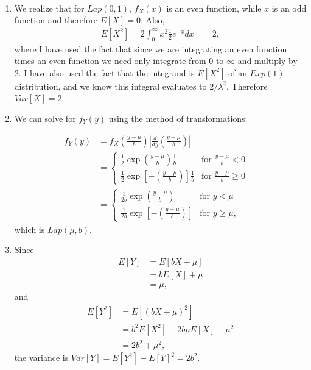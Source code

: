 \begin{problem}{17} $ $

\begin{enumerate}
\item
We realize that for $Lap(0, 1)$, $f_X(x)$ is an even function, while $x$ is an odd function and therefore $E[X]=0$.  Also, 
\begin{align*}
E[X^2] = 2\int_0^{\infty}x^2\frac{1}{2}e^{-x}dx
&=2,
\end{align*}
where I have used the fact that since we are integrating an even function times an even function we need only integrate from $0$ to $\infty$ and multiply by 2.  I have also used the fact that the integrand is $E[X^2]$ of an $Exp(1)$ distribution, and we know this integral evaluates to $2/\lambda^2$.  Therefore $Var[X] = 2$.

\item We can solve for $f_Y(y)$ using the method of transformations:

\begin{align*}  
  f_Y(y) &= f_X\left(\frac{y-\mu}{b} \right)\left | \frac{d}{dy}\left(\frac{y-\mu}{b} \right) \right| \\
&=  \begin{cases}
                                   \frac{1}{2}\exp{\left( \frac{y-\mu}{b}\right)}\frac{1}{b} & \text{for $\frac{y-\mu}{b}<0$} \\
                                  \frac{1}{2}\exp{\left[-\left( \frac{y-\mu}{b}\right)\right]}\frac{1}{b}  & \text{for  $\frac{y-\mu}{b}\ge0$} 
       \end{cases} \quad \\
&= \begin{cases}
                                   \frac{1}{2b}\exp{\left( \frac{y-\mu}{b}\right)} & \text{for $y< \mu$} \\
                                  \frac{1}{2b}\exp{\left[-\left( \frac{y-\mu}{b}\right)\right]}  & \text{for  $y\ge \mu$},
       \end{cases}
\end{align*}
which is $Lap(\mu, b)$.

\item
Since
\begin{align*}
E[Y] & = E[bX+\mu] \\
& = bE[X]+\mu \\
& = \mu,
\end{align*}
and
\begin{align*}
E[Y^2] & = E[(bX+\mu)^2] \\
& = b^2E[X^2]+2b \mu E[X]+\mu^2 \\
& = 2b^2 +\mu^2,
\end{align*}
the variance is $Var[Y] = E[Y^2]-E[Y]^2= 2b^2$.

\end{enumerate}
\end{problem}

